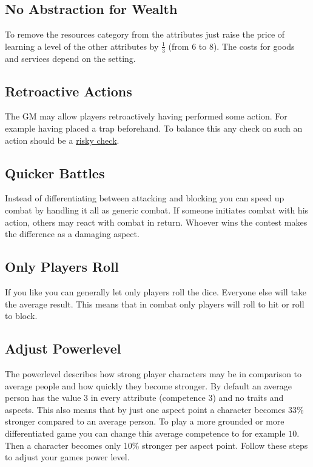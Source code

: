 \documentclass[11pt]{article}
\begin{document}
{\subsection{No Abstraction for Wealth}
\label{sec:org72f49c7}

To remove the resources category from the attributes just raise the price of learning a level of the other attributes by \(\frac{1}{3}\) (from 6 to 8). The costs for goods and services
depend on the setting.
\subsection{Retroactive Actions}
\label{sec:org7f35e4d}

The GM may allow players retroactively having performed some action. For example having placed a trap beforehand. To balance this any check on such an action should be a \hyperref[sec:org39f9888]{risky check}.
\subsection{Quicker Battles}
\label{sec:orgc28ddf5}

Instead of differentiating between attacking and blocking you can speed up combat by handling it all as generic combat. If someone initiates combat with his action, others may react with combat in return. Whoever wins the contest makes the difference as a damaging aspect.
\subsection{Only Players Roll}
\label{sec:org698dc86}
If you like you can generally let only players roll the dice. Everyone else will take the average result. This means that in combat only players will roll to hit or roll to block.
\subsection{Adjust Powerlevel}
\label{sec:org2f83721}

The powerlevel describes how strong player characters may be in comparison to average people and how quickly they become stronger. By default an average person has the value \(3\) in every attribute (competence \(3\)) and no traits and aspects. This also means that by just one aspect point a character becomes 33\% stronger compared to an average person. To play a more grounded or more differentiated game you can change this average competence to for example \(10\). Then a character becomes only 10\% stronger per aspect point. Follow these steps to adjust your games power level.

}
\end{document}
